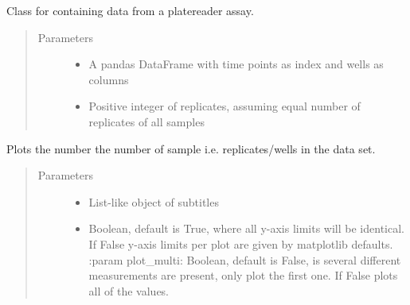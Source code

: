 \documentclass[letterpaper,10pt,english]{sphinxmanual}
\begin{document}
\begin{fulllineitems}
\label{\detokenize{platelib:platelib.plateread.Plate_data}}
Class for containing data from a platereader assay.
\begin{quote}\begin{description}
\item[{Parameters}] \leavevmode\begin{itemize}
\item {} 
 \textendash{} A pandas DataFrame with time points as index and wells as columns

\item {} 
 \textendash{} Positive integer of replicates, assuming equal number of replicates of all samples

\end{itemize}

\end{description}\end{quote}

\begin{fulllineitems}
\label{\detokenize{platelib:platelib.plateread.Plate_data.plot}}
Plots the number the number of sample i.e. replicates/wells in the data 
set.
\begin{quote}\begin{description}
\item[{Parameters}] \leavevmode\begin{itemize}
\item {} 
 \textendash{} List-like object of subtitles

\item {} 
 \textendash{} Boolean, default is True, where all y-axis limits will be identical. If False y-axis limits per plot are given by matplotlib defaults.
:param plot\_multi: Boolean, default is False, is several different measurements are present, only plot the first one. If False plots all of the values.


\end{itemize}
\end{description}
\end{quote}
\end{fulllineitems}
\end{fulllineitems}
\end{document}
